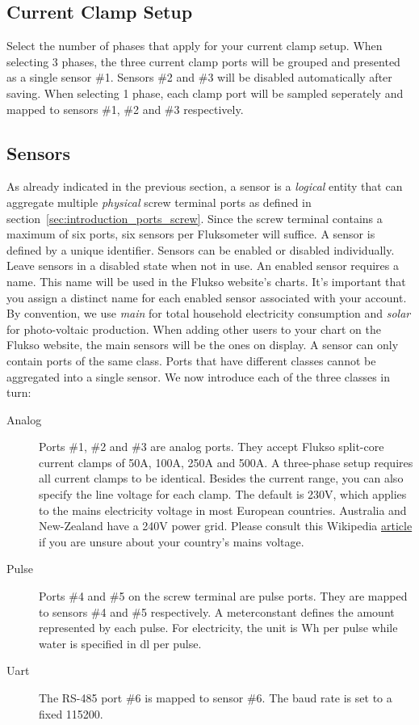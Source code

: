 \subsection{Current Clamp Setup}
Select the number of phases that apply for your current clamp setup. When selecting 3 phases, the three current clamp ports will be grouped and presented as a single sensor \#1. Sensors \#2 and \#3 will be disabled automatically after saving. When selecting 1 phase, each clamp port will be sampled seperately and mapped to sensors \#1, \#2 and \#3 respectively.

\subsection{Sensors}
As already indicated in the previous section, a sensor is a \emph{logical} entity that can aggregate multiple \emph{physical} screw terminal ports as defined in section~\ref{sec:introduction_ports_screw}. Since the screw terminal contains a maximum of six ports, six sensors per Fluksometer will suffice. A sensor is defined by a unique identifier. Sensors can be enabled or disabled individually. Leave sensors in a disabled state when not in use. An enabled sensor requires a name. This name will be used in the Flukso website's charts. It's important that you assign a distinct name for each enabled sensor associated with your account. By convention, we use \emph{main} for total household electricity consumption and \emph{solar} for photo-voltaic production. When adding other users to your chart on the Flukso website, the main sensors will be the ones on display. A sensor can only contain ports of the same class. Ports that have different classes cannot be aggregated into a single sensor. We now introduce each of the three classes in turn:

\begin{description}

\item[Analog] Ports \#1, \#2 and \#3 are analog ports. They accept Flukso split-core current clamps of 50A, 100A, 250A and 500A. A three-phase setup requires all current clamps to be identical. Besides the current range, you can also specify the line voltage for each clamp. The default is 230V, which applies to the mains electricity voltage in most European countries. Australia and New-Zealand have a 240V power grid. Please consult this Wikipedia \href{http://en.wikipedia.org/wiki/Mains_electricity_by_country}{article} if you are unsure about your country's mains voltage.

\item[Pulse] Ports \#4 and \#5 on the screw terminal are pulse ports. They are mapped to sensors \#4 and \#5 respectively. A meterconstant defines the amount represented by each pulse. For electricity, the unit is Wh per pulse while water is specified in dl per pulse.

\item[Uart] The RS-485 port \#6 is mapped to sensor \#6. The baud rate is set to a fixed 115200.

\end{description}

